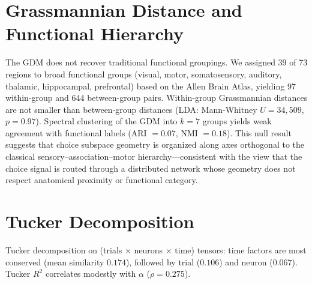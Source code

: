 \documentclass{article}
\begin{document}
\section{Grassmannian Distance and Functional Hierarchy}
\label{app:gdm_hierarchy}

The GDM does not recover traditional functional groupings. We assigned 39 of 73 regions to broad functional groups (visual, motor, somatosensory, auditory, thalamic, hippocampal, prefrontal) based on the Allen Brain Atlas, yielding 97 within-group and 644 between-group pairs. Within-group Grassmannian distances are not smaller than between-group distances (LDA: Mann-Whitney $U = 34{,}509$, $p = 0.97$). Spectral clustering of the GDM into $k = 7$ groups yields weak agreement with functional labels (ARI $= 0.07$, NMI $= 0.18$). This null result suggests that choice subspace geometry is organized along axes orthogonal to the classical sensory--association--motor hierarchy---consistent with the view that the choice signal is routed through a distributed network whose geometry does not respect anatomical proximity or functional category.

\section{Tucker Decomposition}
\label{app:tucker}

Tucker decomposition on (trials $\times$ neurons $\times$ time) tensors: time factors are most conserved (mean similarity $0.174$), followed by trial ($0.106$) and neuron ($0.067$). Tucker $R^2$ correlates modestly with $\alpha$ ($\rho = 0.275$).
\end{document}
